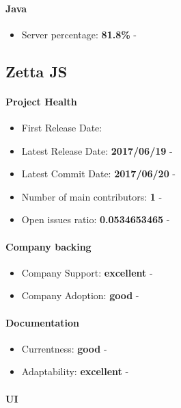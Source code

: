 \documentclass{article}
\begin{document}
\paragraph{Java} 

\begin{itemize}
\item Server percentage: \textbf{81.8\%} - 
\end{itemize}

\subsection{Zetta JS}

\paragraph{Project Health}

\begin{itemize}
\item First Release Date: 
\item Latest Release Date: \textbf{2017/06/19} - 
\item Latest Commit Date: \textbf{2017/06/20} - 
\item Number of main contributors: \textbf{1} - 
\item Open issues ratio: \textbf{0.0534653465} - 
\end{itemize}

\paragraph{Company backing}

\begin{itemize}
\item Company Support: \textbf{excellent} - 
\item Company Adoption: \textbf{good} - 
\end{itemize}

\paragraph{Documentation}

\begin{itemize}
\item Currentness: \textbf{good} - 
\item Adaptability: \textbf{excellent} - 
\end{itemize}

\paragraph{UI}
\end{document}
